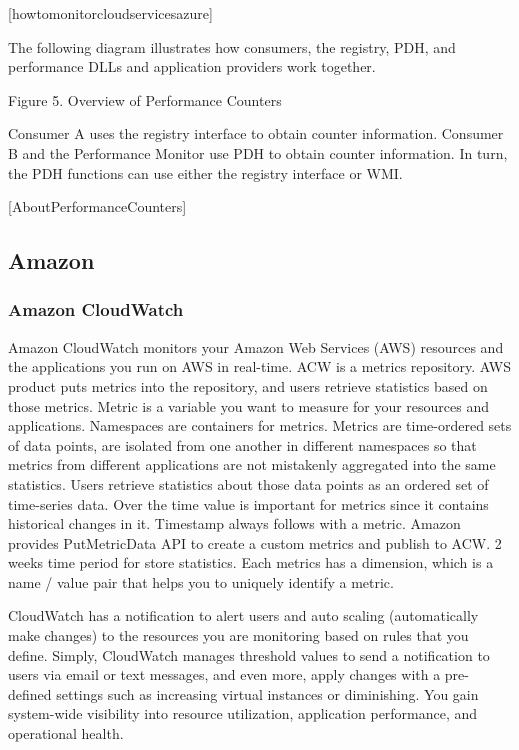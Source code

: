 \documentclass{sig-alternate}
\begin{document}
[howtomonitorcloudservicesazure]

The following diagram illustrates how consumers, the registry, PDH, and performance DLLs and application providers work together.

Figure 5. Overview of Performance Counters

Consumer A uses the registry interface to obtain counter information. Consumer B and the Performance Monitor use PDH to obtain counter information. In turn, the PDH functions can use either the registry interface or WMI.

[AboutPerformanceCounters]

\subsection{Amazon}

\subsubsection{Amazon CloudWatch}

Amazon CloudWatch monitors your Amazon Web Services (AWS) resources and the applications you run on AWS in real-time. ACW is a metrics repository. AWS product puts metrics into the repository, and users retrieve statistics based on those metrics. Metric is a variable you want to measure for your resources and applications. Namespaces are containers for metrics. Metrics are time-ordered sets of data points, are isolated from one another in different namespaces so that metrics from different applications are not mistakenly aggregated into the same statistics. Users retrieve statistics about those data points as an ordered set of time-series data. Over the time value is important for metrics since it contains historical changes in it. Timestamp always follows with a metric. Amazon provides PutMetricData API to create a custom metrics and publish to ACW. 2 weeks time period for store statistics. Each metrics has a dimension, which is a name / value pair that helps you to uniquely identify a metric.

CloudWatch has a notification to alert users and auto scaling (automatically make changes) to the resources you are monitoring based on rules that you define. Simply, CloudWatch manages threshold values to send a notification to users via email or text messages, and even more, apply changes with a pre-defined settings such as increasing virtual instances or diminishing. You gain system-wide visibility into resource utilization, application performance, and operational health.
\end{document}
